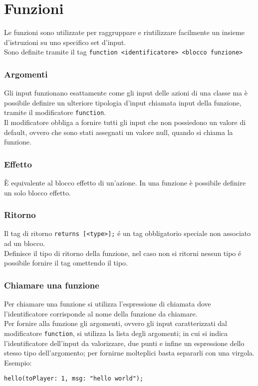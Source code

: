 \section{Funzioni}
Le funzioni sono utilizzate per raggruppare e riutilizzare facilmente un insieme d'istruzioni 
su uno specifico set d'input. \\ 
Sono definite tramite il tag \verb|function <identificatore> <blocco funzione>|

\subsubsection{Argomenti}
Gli input funzionano esattamente come gli input delle azioni di una classe ma è 
possibile definire un ulteriore tipologia d'input chiamata input della funzione,
tramite il modificatore \verb|function|. \\
Il modificatore obbliga a fornire tutti gli input che non possiedono un valore di default,
ovvero che sono stati assegnati un valore null, quando si chiama la funzione.

\subsubsection{Effetto}
È equivalente al blocco effetto di un’azione. 
In una funzione è possibile definire un solo blocco effetto.

\subsubsection{Ritorno}
Il tag di ritorno \verb|returns [<type>];| é un tag obbligatorio speciale non associato ad un blocco. \\
Definisce il tipo di ritorno della funzione, nel caso non si ritorni nessun tipo é possibile 
fornire il tag omettendo il tipo.

\subsubsection{Chiamare una funzione} \label{ChiamataFunzione}
Per chiamare una funzione si utilizza l'espressione di chiamata dove l'identificatore corrisponde al nome
della funzione da chiamare. \\
Per fornire alla funzione gli argomenti, ovvero gli input caratterizzati dal modificatore \verb|function|, si 
utilizza la lista degli argomenti; in cui si indica l'identificatore dell'input da valorizzare, due punti e 
infine un espressione dello stesso tipo dell'argomento; per fornirne molteplici basta separarli con una virgola. Esempio:
\begin{lstlisting}
hello(toPlayer: 1, msg: "hello world");
\end{lstlisting}


